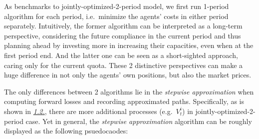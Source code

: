 \documentclass[
]{article}
\begin{document}
As benchmarks to jointly-optimized-2-period model, we first run 1-period
algorithm for each period, i.e.~minimize the agents' costs in either
period separately. Intuitively, the former algorithm can be interpreted
as a long-term perspective, considering the future compliance in the
current period and thus planning ahead by investing more in increasing
their capacities, even when at the first period end. And the latter one
can be seen as a short-sighted approach, caring only for the current
quota. These 2 distinctive perspectives can make a huge difference in
not only the agents' own positions, but also the market prices.

The only differences between 2 algorithms lie in the \emph{stepwise
approximation} when computing forward losses and recording approximated
paths. Specifically, as is shown in
\protect\hyperlink{12-rec-market-modeling-with-fbsdes}{\emph{1.2.}},
there are more additional processes (e.g.~\(V_t^i\)) in
jointly-optimized-2-period case. Yet in general, the \emph{stepwise
approximation} algorithm can be roughly displayed as the following
psuedocaodes:
\end{document}

